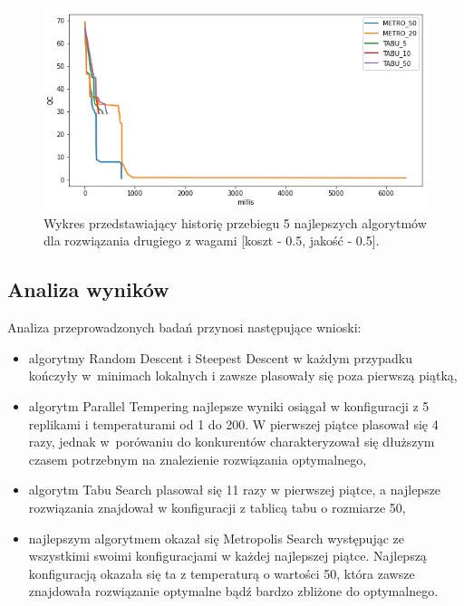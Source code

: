 \begin{figure}[ht]{}
	\centering
	\includegraphics[scale=0.85]{images/solution_2_cqp_3.png}
	\caption {
		 Wykres przedstawiający historię przebiegu 5 najlepszych algorytmów dla rozwiązania drugiego z wagami [koszt - 0.5, jakość - 0.5]. 
	}
	\label{fig:sol-2-w-3}
\end{figure}

\subsection{Analiza wyników}
Analiza przeprowadzonych badań przynosi następujące wnioski:
\begin{itemize}
    \item algorytmy Random Descent i Steepest Descent w każdym przypadku kończyły w~minimach lokalnych i zawsze plasowały się poza pierwszą piątką,
    \item algorytm Parallel Tempering najlepsze wyniki osiągał w konfiguracji z 5 replikami i temperaturami od 1 do 200. W pierwszej piątce plasował się 4 razy, jednak w~porówaniu do konkurentów charakteryzował się dłuższym czasem potrzebnym na znalezienie rozwiązania optymalnego,
    \item algorytm Tabu Search plasował się 11 razy w pierwszej piątce, a najlepsze rozwiązania znajdował w konfiguracji z tablicą tabu o rozmiarze 50,
    \item najlepszym algorytmem okazał się Metropolis Search występując ze wszystkimi swoimi konfiguracjami w każdej najlepszej piątce. Najlepszą konfiguracją okazała się ta z temperaturą o wartości 50, która zawsze znajdowała rozwiązanie optymalne bądź bardzo zbliżone do optymalnego.
\end{itemize}

